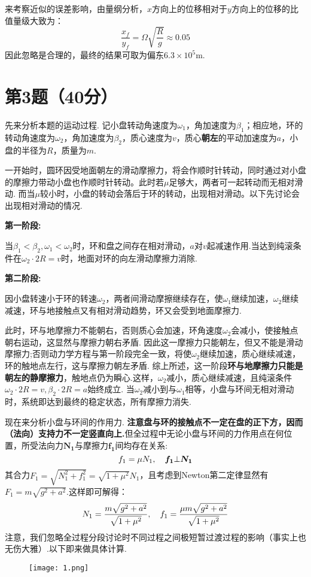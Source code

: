 \documentclass{ctexart}
\begin{document}
  来考察近似的误差影响，由量纲分析，$x$方向上的位移相对于$y$方向上的位移的比值量级大致为：
  \[\frac{x_f}{y_f}=\varOmega\sqrt{\frac{R}{g}}\approx0.05\]
  因此忽略是合理的，最终的结果可取为偏东$6.3\times 10^5\mathrm{m}$.

\clearpage
\section*{第3题（40分）}

先来分析本题的运动过程. 记小盘转动角速度为$\omega_1$，角加速度为$\beta_1$；相应地，环的转动角速度为$\omega_2$，角加速度为$\beta_2$，质心速度为$v$，质心\textbf{朝左}的平动加速度为$a$，小盘的半径为$R$，质量为$m$. 

一开始时，圆环因受地面朝左的滑动摩擦力，将会作顺时针转动，同时通过对小盘的摩擦力带动小盘也作顺时针转动。此时若$\mu$足够大，两者可一起转动而无相对滑动. 而当$\mu$较小时，小盘的转动会落后于环的转动，出现相对滑动。以下先讨论会出现相对滑动的情况.

\noindent \textbf{第一阶段:}

当$\beta_1<\beta_2,\omega_1<\omega_2$时，环和盘之间存在相对滑动，$a$对$v$起减速作用.当达到纯滚条件在$\omega_2\cdot 2R=v$时，地面对环的向左滑动摩擦力消除.

\noindent \textbf{第二阶段:}

因小盘转速小于环的转速$\omega_2$，两者间滑动摩擦继续存在，使$\omega_1$继续加速，$\omega_2$继续减速，环与地接触点又有相对滑动趋势，环又会受到地面摩擦力. 

此时，环与地摩擦力不能朝右，否则质心会加速，环角速度$\omega_2$会减小，使接触点朝右运动，这显然与摩擦力朝右矛盾. 因此这一摩擦力只能朝左，但又不能是滑动摩擦力;否则动力学方程与第一阶段完全一致，将使$\omega_2$继续加速，质心继续减速，环的触地点左行，这与摩擦力朝左矛盾.
综上所述，这一阶段\textbf{环与地摩擦力只能是朝左的静摩擦力}，触地点仍为瞬心.这样，$\omega_2$减小，质心继续减速，且纯滚条件$\omega_2\cdot 2R=v, \beta_2\cdot 2R=a$始终成立. 当$\omega_2$减小到与$\omega_1$相等，小盘与环间无相对滑动时，系统即达到最终的稳定状态，所有摩擦力消失.

现在来分析小盘与环间的作用力. \textbf{注意盘与环的接触点不一定在盘的正下方，因而（法向）支持力不一定竖直向上.}但全过程中无论小盘与环间的力作用点在何位置，所受法向力$\bm{N_1}$与摩擦力$\bm{f_1}$间均存在关系:
\begin{equation}
    f_1=\mu N_1,\quad \bm{f_1}\bot \bm{N_1}\notag
\end{equation}
其合力$F_1=\sqrt{N_1^2+f_1^2}=\sqrt{1+\mu^2}N_1$，且考虑到Newton第二定律显然有$F_1=m\sqrt{g^2+a^2}$.这样即可解得：
\begin{equation}
    N_1=\frac{m\sqrt{g^2+a^2}}{\sqrt{1+\mu^2}},\quad f_1=\frac{\mu m\sqrt{g^2+a^2}}{\sqrt{1+\mu^2}}\notag
\end{equation}
注意，我们忽略全过程分段讨论时不同过程之间极短暂过渡过程的影响（事实上也无伤大雅）.以下即来做具体计算.
\begin{figure}[H]
  \centering
  \texttt{[image: 1.png]}
\end{figure}
\end{document}
